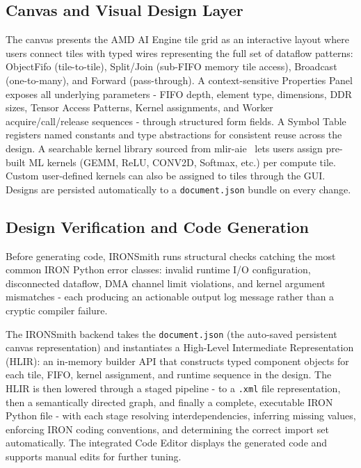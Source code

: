\vspace{-2mm}
\subsection{Canvas and Visual Design Layer}
\vspace{-3mm}

The canvas presents the AMD AI Engine tile grid as an interactive layout where users connect tiles with typed wires representing the full set of dataflow patterns: ObjectFifo (tile-to-tile), Split/Join (sub-FIFO memory tile access), Broadcast (one-to-many), and Forward (pass-through). A context-sensitive Properties Panel exposes all underlying parameters - FIFO depth, element type, dimensions, DDR sizes, Tensor Access Patterns, Kernel assignments, and Worker acquire/call/release sequences - through structured form fields. A Symbol Table registers named constants and type abstractions for consistent reuse across the design. A searchable kernel library sourced from mlir-aie~\cite{mliraie} lets users assign pre-built ML kernels (GEMM, ReLU, CONV2D, Softmax, etc.) per compute tile. Custom user-defined kernels can also be assigned to tiles through the GUI.
Designs are persisted automatically to a \texttt{document.json} bundle on every change.

\vspace{-2mm}
\subsection{Design Verification and Code Generation}
\vspace{-3mm}

Before generating code, IRONSmith runs structural checks catching the most common IRON Python error classes: invalid runtime I/O configuration, disconnected dataflow, DMA channel limit violations, and kernel argument mismatches - each producing an actionable output log message rather than a cryptic compiler failure.

The IRONSmith backend takes the \texttt{document.json} (the auto-saved persistent canvas representation) and instantiates a High-Level Intermediate Representation (HLIR): an in-memory builder API that constructs typed component objects for each tile, FIFO, kernel assignment, and runtime sequence in the design. The HLIR is then lowered through a staged pipeline - to a \texttt{.xml} file representation, then a semantically directed graph, and finally a complete, executable IRON Python file - with each stage resolving interdependencies, inferring missing values, enforcing IRON coding conventions, and determining the correct import set automatically. The integrated Code Editor displays the generated code and supports manual edits for further tuning.

\vspace{-2mm}
